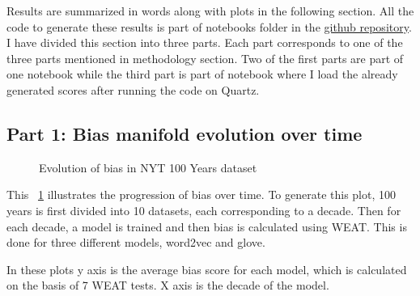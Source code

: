 \documentclass{article}
\begin{document}
Results are summarized in words along with plots in the following section. All the code to generate these results is part of notebooks folder in the \href{https://github.com/thunderock/bias_manifold/tree/master/notebooks}{github repository}. I have divided this section into three parts. Each part corresponds to one of the three parts mentioned in methodology section. Two of the first parts are part of one notebook while the third part is part of notebook where I load the already generated scores after running the code on Quartz.


\subsection{Part 1: Bias manifold evolution over time}
\begin{figure}[H]
    \centering
    \qquad
\caption{Evolution of bias in NYT 100 Years dataset}
    \label{fig:evolution}
\end{figure}

This ~\ref{fig:evolution} illustrates the progression of bias over time. To generate this plot, 100 years is first divided into 10 datasets, each corresponding to a decade. Then for each decade, a model is trained and then bias is calculated using WEAT. This is done for three different models, word2vec and glove.

In these plots y axis is the average bias score for each model, which is calculated on the basis of 7 WEAT tests. X axis is the decade of the model.
\end{document}
